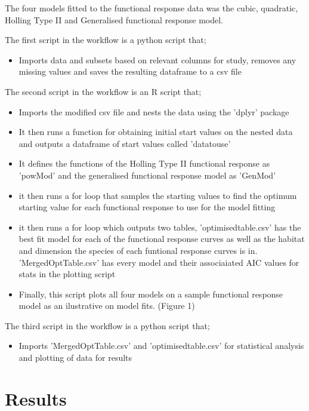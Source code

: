 \documentclass[11pt]{article}
\begin{document}
The four models fitted to the functional response data was the cubic, quadratic, Holling Type II and Generalised functional response model. 

The first script in the workflow is a python script that;
	\begin{itemize}
	\item Imports data and subsets based on relevant columns for study, removes any missing values and saves the resulting dataframe to a csv file 
	\end{itemize}

The second script in the workflow is an R script that;
\begin{itemize}
	\item Imports the modified csv file and nests the data using the 'dplyr' package 
	\item It then runs a function for obtaining initial start values on the nested data and outputs a dataframe of start values called 'datatouse'
	\item It defines the functions of the Holling Type II functional response as 'powMod' and the generalised functional response model as 'GenMod'
	\item it then runs a for loop that samples the starting values to find the optimum starting value for each functional response to use for the model fitting
	\item it then runs a for loop which outputs two tables, 'optimisedtable.csv' has the best fit model for each of the functional response curves as well as the habitat and dimension the species of each funtional response curves is in. 'MergedOptTable.csv' has every model and their associaiated AIC values for stats in the plotting script 
	\item Finally, this script plots all four models on a sample functional response model as an ilustrative on model fits. (Figure 1)
\end{itemize}

The third script in the workflow is a python script that;
\begin{itemize}
	\item Imports 'MergedOptTable.csv' and 'optimisedtable.csv' for statistical analysis and plotting of data for results 
\end{itemize}


	\section{Results}
\noindent
\end{document}
